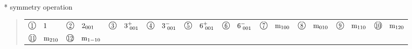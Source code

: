 \documentclass[fleqn,10pt,landscape]{jsarticle}
\begin{document}
* symmetry operation
\begin{quote}
\begin{tabular}{llllllllll}
$ {\ooalign{\hfil\resizebox{.8\width}{\height}{1}\hfil\crcr\raise.1ex\hbox{\large$\bigcirc$}}}\quad 1 $ & $ {\ooalign{\hfil\resizebox{.8\width}{\height}{2}\hfil\crcr\raise.1ex\hbox{\large$\bigcirc$}}}\quad 2{}_{001} $ & $ {\ooalign{\hfil\resizebox{.8\width}{\height}{3}\hfil\crcr\raise.1ex\hbox{\large$\bigcirc$}}}\quad 3^{+}_{\,\,001} $ & $ {\ooalign{\hfil\resizebox{.8\width}{\height}{4}\hfil\crcr\raise.1ex\hbox{\large$\bigcirc$}}}\quad 3^{-}_{\,\,001} $ & $ {\ooalign{\hfil\resizebox{.8\width}{\height}{5}\hfil\crcr\raise.1ex\hbox{\large$\bigcirc$}}}\quad 6^{+}_{\,\,001} $ & $ {\ooalign{\hfil\resizebox{.8\width}{\height}{6}\hfil\crcr\raise.1ex\hbox{\large$\bigcirc$}}}\quad 6^{-}_{\,\,001} $ & $ {\ooalign{\hfil\resizebox{.8\width}{\height}{7}\hfil\crcr\raise.1ex\hbox{\large$\bigcirc$}}}\quad {\rm m}_{100} $ & $ {\ooalign{\hfil\resizebox{.8\width}{\height}{8}\hfil\crcr\raise.1ex\hbox{\large$\bigcirc$}}}\quad {\rm m}_{010} $ & $ {\ooalign{\hfil\resizebox{.8\width}{\height}{9}\hfil\crcr\raise.1ex\hbox{\large$\bigcirc$}}}\quad {\rm m}_{110} $ & $ {\ooalign{\hfil\resizebox{.8\width}{\height}{10}\hfil\crcr\raise.1ex\hbox{\large$\bigcirc$}}}\quad {\rm m}_{120} $ \\
$ {\ooalign{\hfil\resizebox{.8\width}{\height}{11}\hfil\crcr\raise.1ex\hbox{\large$\bigcirc$}}}\quad {\rm m}_{210} $ & $ {\ooalign{\hfil\resizebox{.8\width}{\height}{12}\hfil\crcr\raise.1ex\hbox{\large$\bigcirc$}}}\quad {\rm m}_{1-10} $ & $  $ & $  $ & $  $ & $  $ & $  $ & $  $ & $  $ & $  $
\end{tabular}
\end{quote}
\end{document}
